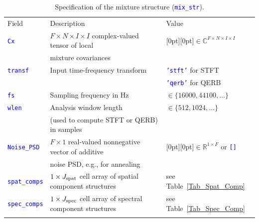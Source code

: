 \documentclass{article}
\newcommand{\matlabcolor}{blue}
\newcommand{\matvar}[1]{\textcolor{\matlabcolor}{\tt {#1}}}
\begin{document}



\newpage

\begin{table}[t]
  \begin{center}
   \begin{tabular}{l|l|l}
      Field & Description & Value \\
      \hhline{===}
       \matvar{Cx} & $F \times N \times I \times I$ complex-valued tensor of local & \raisebox{-4.5pt}[0pt][0pt]{$\in \mathbb C^{F \times N \times I \times I}$} \\
                & mixture covariances & \\
      \hhline{---}
       \matvar{transf} & Input time-frequency transform & \matvar{'stft'} for STFT \\
      \hhline{~~-}
                    &           & \matvar{'qerb'} for QERB \\
      \hhline{---}
       \matvar{fs} & Sampling frequency in Hz & $\in \{ 16000, 44100, \ldots \}$ \\
      \hhline{---}
       \matvar{wlen} & Analysis window length & $\in \{ 512, 1024, \ldots \}$ \\
                  & (used to compute STFT or QERB) in samples & \\
      \hhline{---}
       \matvar{Noise\_PSD} & $F \times 1$ real-valued nonnegative vector of additive & \raisebox{-4.5pt}[0pt][0pt]{$\in \mathbb R^{1 \times F}$ or \matvar{[]}} \\
                        & noise PSD, e.g., for annealing &  \\
      \hhline{---}
       \matvar{spat\_comps} & $1 \times J_{\rm spat}$ cell array of spatial component structures & see Table~\ref{Tab_Spat_Comp} \\
      \hhline{---}
       \matvar{spec\_comps} & $1 \times J_{\rm spec}$ cell array of spectral component structures & see Table~\ref{Tab_Spec_Comp} \\
      \hhline{===}
    \end{tabular}
    \caption{Specification of the mixture structure (\matvar{mix\_str}).}
    \label{Tab_Mix_Str}
  \end{center}
\end{table}
\end{document}
